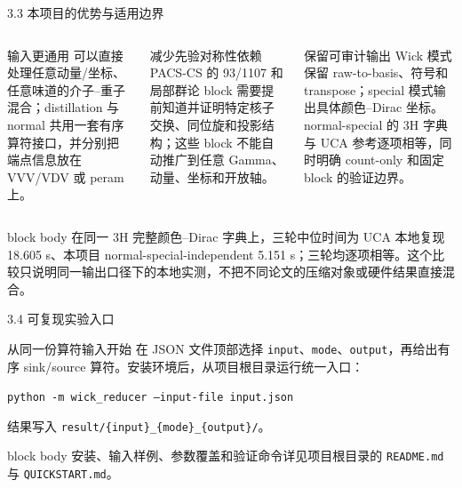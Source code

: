 \documentclass[aspectratio=169,UTF8,fontset=fandol]{ctexbeamer}
\begin{document}
\begin{frame}{3.3 本项目的优势与适用边界}
\small
\begin{columns}[T,onlytextwidth]
\begin{block}{输入更通用}
\scriptsize
可以直接处理任意动量/坐标、任意味道的介子--重子混合；distillation 与 normal 共用一套有序算符接口，并分别把端点信息放在 VVV/VDV 或 peram 上。
\end{block}
\begin{block}{减少先验对称性依赖}
\scriptsize
PACS-CS 的 93/1107 和局部群论 block 需要提前知道并证明特定核子交换、同位旋和投影结构；这些 block 不能自动推广到任意 Gamma、动量、坐标和开放轴。
\end{block}
\begin{block}{保留可审计输出}
\scriptsize
Wick 模式保留 raw-to-basis、符号和 transpose；special 模式输出具体颜色--Dirac 坐标。normal-special 的 3H 字典与 UCA 参考逐项相等，同时明确 count-only 和固定 block 的验证边界。
\end{block}
\end{columns}
\vspace{0.35em}
\begin{beamercolorbox}[sep=0.48em,wd=\linewidth]{block body}
\scriptsize
在同一 3H 完整颜色--Dirac 字典上，三轮中位时间为 UCA 本地复现 18.605 s、本项目 normal-special-independent 5.151 s；三轮均逐项相等。这个比较只说明同一输出口径下的本地实测，不把不同论文的压缩对象或硬件结果直接混合。
\end{beamercolorbox}
\end{frame}

\begin{frame}{3.4 可复现实验入口}
\small
\begin{block}{从同一份算符输入开始}
在 JSON 文件顶部选择 \texttt{input}、\texttt{mode}、\texttt{output}，再给出有序 sink/source 算符。安装环境后，从项目根目录运行统一入口：
\begin{center}
\texttt{python -m wick\_reducer --input-file input.json}
\end{center}
结果写入 \texttt{result/\{input\}\_\{mode\}\_\{output\}/}。
\end{block}
\vspace{0.4em}
\begin{beamercolorbox}[sep=0.65em,wd=\linewidth]{block body}
安装、输入样例、参数覆盖和验证命令详见项目根目录的 \texttt{README.md} 与 \texttt{QUICKSTART.md}。
\end{beamercolorbox}
\end{frame}
\end{document}
